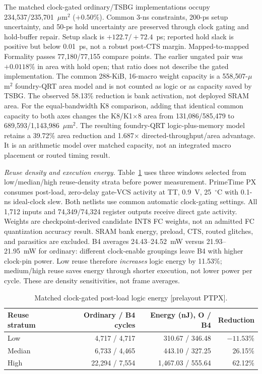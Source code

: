 \documentclass[journal]{IEEEtran}
\begin{document}
The matched clock-gated ordinary/TSBG implementations occupy
234{,}537/235{,}701~$\mu$m$^2$ ($+0.50\%$).  Common 3-ns constraints,
200-ps setup uncertainty, and 50-ps hold uncertainty are preserved through
clock gating and hold-buffer repair.  Setup slack is $+122.7/+72.4$~ps;
reported hold slack is positive but below 0.01~ps, not a robust post-CTS
margin.  Mapped-to-mapped Formality passes 77,180/77,155 compare points.
The earlier ungated pair was $+0.0118\%$ in area with hold open; that ratio
does not describe the gated implementation.  The common 288-KiB, 16-macro weight capacity is a
558{,}507-$\mu$m$^2$ foundry-QRT area model and is not counted as logic or as
capacity saved by TSBG.  The observed 58.13\% reduction is bank activation,
not deployed SRAM area.
For the equal-bandwidth K8 comparison, adding that identical common capacity
to both axes changes the K8/K1$\times$8 area from 131{,}086/585{,}479 to
689{,}593/1{,}143{,}986~$\mu$m$^2$.  The resulting foundry-QRT
logic-plus-memory model retains a 39.72\% area reduction and 1.687$\times$
directed-throughput/area advantage.  It is an arithmetic model over matched
capacity, not an integrated macro placement or routed timing result.

\emph{Reuse density and execution energy.} Table~\ref{tab:power} uses three
windows selected from low/median/high reuse-density strata before power
measurement.  PrimeTime PX consumes post-load, zero-delay gate-VCS activity
at TT, 0.9~V, 25~$^\circ$C with 0.1-ns ideal-clock slew.  Both netlists use
common automatic clock-gating settings.  All 1,712 inputs and
74,349/74,324 register outputs receive direct gate activity.  Weights are
checkpoint-derived candidate INT8 FC weights, not an admitted FC quantization
accuracy result.  SRAM bank energy, preload, CTS, routed glitches, and
parasitics are excluded.  B4 averages 24.43--24.52~mW versus
21.93--21.95~mW for ordinary: different clock-enable groupings leave B4 with
higher clock-pin power.  Low reuse therefore \emph{increases} logic energy
by 11.53\%; medium/high reuse saves energy through shorter execution, not
lower power per cycle.  These are density sensitivities, not frame averages.

\begin{table}[t]
\caption{Matched clock-gated post-load logic energy [prelayout PTPX].}
\label{tab:power}
\centering
\scriptsize
\begin{tabular}{@{}lrrr@{}}
\toprule
Reuse stratum & Ordinary / B4 cycles & Energy (nJ), O / B4 & Reduction \\
\midrule
Low & 4,717 / 4,717 & 310.67 / 346.48 & $-11.53\%$ \\
Median & 6,733 / 4,465 & 443.10 / 327.25 & 26.15\% \\
High & 22,294 / 7,554 & 1,467.03 / 555.64 & 62.12\% \\
\bottomrule
\end{tabular}
\end{table}
\end{document}
